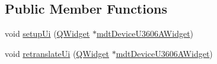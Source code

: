 \subsection*{Public Member Functions}
\begin{DoxyCompactItemize}
\item 
void \hyperlink{class_ui__mdt_device_u3606_a_widget_a2feb0a9bb350eeb5b8f79aa1caf7812e}{setup\-Ui} (\hyperlink{class_q_widget}{Q\-Widget} $\ast$\hyperlink{classmdt_device_u3606_a_widget}{mdt\-Device\-U3606\-A\-Widget})
\item 
void \hyperlink{class_ui__mdt_device_u3606_a_widget_a93edfa6bf95a90961fc73dce340f20d6}{retranslate\-Ui} (\hyperlink{class_q_widget}{Q\-Widget} $\ast$\hyperlink{classmdt_device_u3606_a_widget}{mdt\-Device\-U3606\-A\-Widget})
\end{DoxyCompactItemize}

